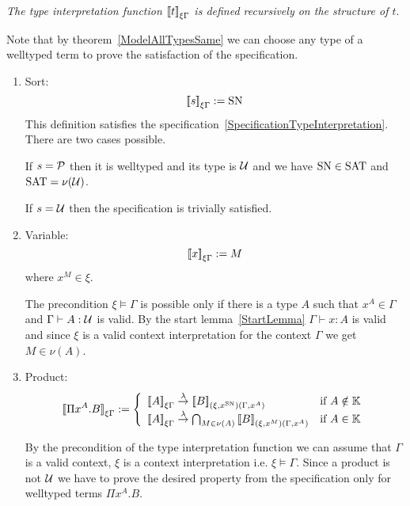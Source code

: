 \begin{definition}
    \label{DefinitionTypeInterpretation}
    \emph{The type interpretation function ${{[\![} t{]\!]}}_{\xi\Gamma}$ is defined
    recursively on the structure of $t$}.

    Note that by theorem~\ref{ModelAllTypesSame} we can choose any type of a
    welltyped term to prove the satisfaction of the specification.

    \begin{enumerate}
    \item Sort:
        $$
        {{[\![} s{]\!]}}_{\xi\Gamma} := \text{SN}
        $$
        This definition satisfies the
            specification~\ref{SpecificationTypeInterpretation}. There are two
            cases possible.

            If $s = {\cal P}$ then it is welltyped and its type is ${\cal U}$ and we
            have $\text{SN} \in \text{SAT}$ and $\text{SAT} = \nu({\cal U})$.

            If $s = {\cal U}$ then the specification is trivially satisfied.

    \item Variable:
        $$
        {{[\![} x{]\!]}}_{\xi\Gamma} := M
        $$
        where $x^{M} \in \xi$.

        The precondition $\xi \vDash \Gamma$ is possible only if there is a type
            $A$ such that $x^A \in \Gamma$ and $\Gamma \vdash A: {\cal U}$ is valid. By the start
            lemma~\ref{StartLemma} $\Gamma \vdash x : A$ is valid and since
            $\xi$ is a valid context interpretation for the context $\Gamma$ we
            get $M \in \nu(A)$.


    \item Product:
        $$
            \typeinter{\Pi x^A.B}{\xi\Gamma}
            :=
            \left\{
            \begin{array}{ll}
                \typeinter{A}{\xi\Gamma}
                \tolambda
                \typeinter{B}{(\xi,x^\SN)(\Gamma,x^A)}
                & \text{if } A \notin \Kinds
                \\
                \typeinter{A}{\xi\Gamma}
                \tolambda
                \bigcap_{M\in\nu(A)}
                \typeinter{B}{(\xi,x^M)(\Gamma,x^A)}
                & \text{if }  A \in \Kinds
            \end{array}
            \right.
        $$

        By the precondition of the type interpretation function we can assume
            that $\Gamma$ is a valid context, $\xi$ is a context
            interpretation i.e. $\xi \vDash \Gamma$. Since a product is not
            ${\cal U}$ we have to prove the desired property from the specification
            only for welltyped terms $\Pi x^A.B$.


\end{enumerate}
\end{definition}
